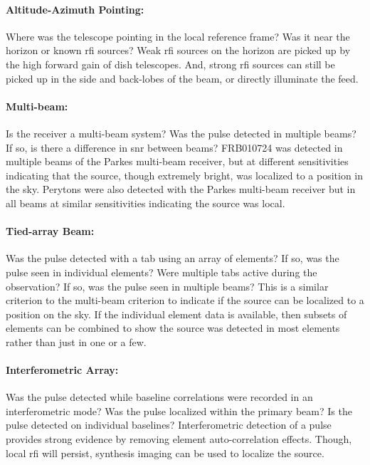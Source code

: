 \documentclass[a4paper,fleqn,usenatbib]{mnras}
\begin{document}
\paragraph{Altitude-Azimuth Pointing:}

Where was the telescope pointing in the local reference frame? Was it near the
horizon or known \gls{rfi} sources? Weak \gls{rfi} sources on the horizon are
picked up by the high forward gain of dish telescopes. And, strong \gls{rfi}
sources can still be picked up in the side and back-lobes of the beam, or
directly illuminate the feed.

\paragraph{Multi-beam:}

Is the receiver a multi-beam system? Was the pulse detected in multiple beams?
If so, is there a difference in \gls{snr} between beams? FRB010724
\citep{2007Sci...318..777L} was detected in multiple beams of the Parkes
multi-beam receiver, but at different sensitivities indicating that the source,
though extremely bright, was localized to a position in the sky. Perytons were
also detected with the Parkes multi-beam receiver but in all beams at similar
sensitivities indicating the source was local.

\paragraph{Tied-array Beam:}

Was the pulse detected with a \gls{tab} using an array of elements? If so, was
the pulse seen in individual elements? Were multiple \glspl{tab} active during
the observation? If so, was the pulse seen in multiple beams? This is a similar
criterion to the multi-beam criterion to indicate if the source can be localized
to a position on the sky. If the individual element data is available, then
subsets of elements can be combined to show the source was detected in most
elements rather than just in one or a few.

\paragraph{Interferometric Array:}

Was the pulse detected while baseline correlations were recorded in an
interferometric mode? Was the pulse localized within the primary beam? Is the
pulse detected on individual baselines? Interferometric detection of a pulse
provides strong evidence by removing element auto-correlation effects. Though,
local \gls{rfi} will persist, synthesis imaging can be used to localize the
source.
\end{document}
